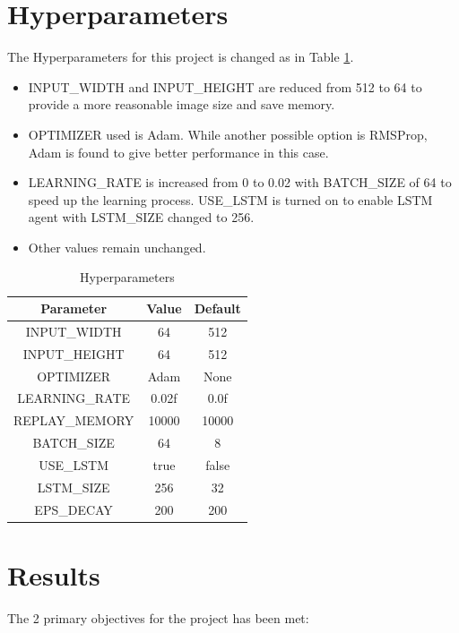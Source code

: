 \documentclass[10pt,journal,compsoc]{IEEEtran}
\begin{document}
\section{Hyperparameters}

The Hyperparameters for this project is changed as in Table  \ref{tab:hyperparameters}.

\begin{itemize}
    \item INPUT\_WIDTH and INPUT\_HEIGHT are reduced from 512 to 64 to provide a more reasonable image size and save memory.
    \item OPTIMIZER used is Adam.  While another possible option is RMSProp, Adam is found to give better performance in this case.
    \item LEARNING\_RATE is increased from 0 to 0.02 with BATCH\_SIZE of 64 to speed up the learning process.  USE\_LSTM is turned on to enable LSTM agent with LSTM\_SIZE changed to 256.
    \item Other values remain unchanged.
\end{itemize}


\begin{table}
\centering
\begin{tabular}{c|c|c}
Parameter & Value & Default \\\hline
INPUT\_WIDTH & 64 & 512\\
INPUT\_HEIGHT & 64 & 512\\
OPTIMIZER & Adam & None\\
LEARNING\_RATE & 0.02f & 0.0f\\
REPLAY\_MEMORY & 10000 & 10000\\
BATCH\_SIZE & 64 & 8\\ 
USE\_LSTM & true & false\\
LSTM\_SIZE & 256 & 32\\
EPS\_DECAY & 200 & 200

\end{tabular}
\caption{\label{tab:hyperparameters}Hyperparameters}
\end{table}



\section{Results}
The 2 primary objectives for the project has been met:
\end{document}
